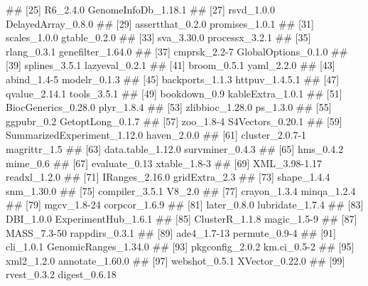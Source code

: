 \documentclass[8pt,a4,]{article}
\renewenvironment{verbatim}{\color{codecolor}\begin{myshaded}\begin{oldverbatim}}{\end{oldverbatim}\end{myshaded}}
\begin{document}
\begin{verbatim}
##  [25] R6_2.4.0                      GenomeInfoDb_1.18.1          
##  [27] rsvd_1.0.0                    DelayedArray_0.8.0           
##  [29] assertthat_0.2.0              promises_1.0.1               
##  [31] scales_1.0.0                  gtable_0.2.0                 
##  [33] sva_3.30.0                    processx_3.2.1               
##  [35] rlang_0.3.1                   genefilter_1.64.0            
##  [37] cmprsk_2.2-7                  GlobalOptions_0.1.0          
##  [39] splines_3.5.1                 lazyeval_0.2.1               
##  [41] broom_0.5.1                   yaml_2.2.0                   
##  [43] abind_1.4-5                   modelr_0.1.3                 
##  [45] backports_1.1.3               httpuv_1.4.5.1               
##  [47] qvalue_2.14.1                 tools_3.5.1                  
##  [49] bookdown_0.9                  kableExtra_1.0.1             
##  [51] BiocGenerics_0.28.0           plyr_1.8.4                   
##  [53] zlibbioc_1.28.0               ps_1.3.0                     
##  [55] ggpubr_0.2                    GetoptLong_0.1.7             
##  [57] zoo_1.8-4                     S4Vectors_0.20.1             
##  [59] SummarizedExperiment_1.12.0   haven_2.0.0                  
##  [61] cluster_2.0.7-1               magrittr_1.5                 
##  [63] data.table_1.12.0             survminer_0.4.3              
##  [65] hms_0.4.2                     mime_0.6                     
##  [67] evaluate_0.13                 xtable_1.8-3                 
##  [69] XML_3.98-1.17                 readxl_1.2.0                 
##  [71] IRanges_2.16.0                gridExtra_2.3                
##  [73] shape_1.4.4                   snm_1.30.0                   
##  [75] compiler_3.5.1                V8_2.0                       
##  [77] crayon_1.3.4                  minqa_1.2.4                  
##  [79] mgcv_1.8-24                   corpcor_1.6.9                
##  [81] later_0.8.0                   lubridate_1.7.4              
##  [83] DBI_1.0.0                     ExperimentHub_1.6.1          
##  [85] ClusterR_1.1.8                magic_1.5-9                  
##  [87] MASS_7.3-50                   rappdirs_0.3.1               
##  [89] ade4_1.7-13                   permute_0.9-4                
##  [91] cli_1.0.1                     GenomicRanges_1.34.0         
##  [93] pkgconfig_2.0.2               km.ci_0.5-2                  
##  [95] xml2_1.2.0                    annotate_1.60.0              
##  [97] webshot_0.5.1                 XVector_0.22.0               
##  [99] rvest_0.3.2                   digest_0.6.18                

\end{verbatim}
\end{document}
